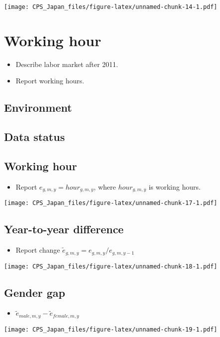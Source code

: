 \documentclass[
]{book}
\providecommand{\tightlist}{%
  \setlength{\itemsep}{0pt}\setlength{\parskip}{0pt}}
\begin{document}
\texttt{[image: CPS\_Japan\_files/figure-latex/unnamed-chunk-14-1.pdf]}

\hypertarget{working-hour}{%
\chapter{Working hour}\label{working-hour}}

\begin{itemize}
\item
  Describe labor market after 2011.
\item
  Report working hours.
\end{itemize}

\hypertarget{environment-3}{%
\section{Environment}\label{environment-3}}

\hypertarget{data-status-1}{%
\section{Data status}\label{data-status-1}}

\hypertarget{working-hour-1}{%
\section{Working hour}\label{working-hour-1}}

\begin{itemize}
\tightlist
\item
  Report \(e_{g,m,y} = hour_{g,m,y}\), where \(hour_{g,m,y}\) is working hours.
\end{itemize}

\texttt{[image: CPS\_Japan\_files/figure-latex/unnamed-chunk-17-1.pdf]}

\hypertarget{year-to-year-difference}{%
\section{Year-to-year difference}\label{year-to-year-difference}}

\begin{itemize}
\tightlist
\item
  Report change \(\tilde e_{g,m,y}=e_{g,m,y}/e_{g,m,y-1}\)
\end{itemize}

\texttt{[image: CPS\_Japan\_files/figure-latex/unnamed-chunk-18-1.pdf]}

\hypertarget{gender-gap-3}{%
\section{Gender gap}\label{gender-gap-3}}

\begin{itemize}
\tightlist
\item
  \(\tilde e_{male,m,y}-\tilde e_{female,m,y}\)
\end{itemize}

\texttt{[image: CPS\_Japan\_files/figure-latex/unnamed-chunk-19-1.pdf]}

  
\end{document}
